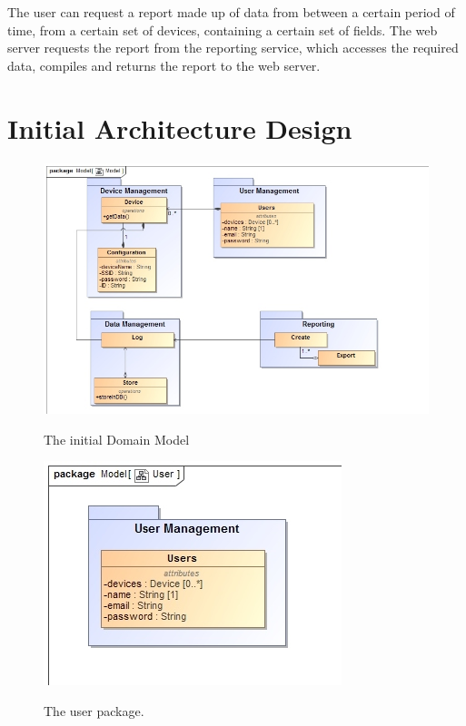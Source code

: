 \documentclass[paper=a4, fontsize=11pt]{scrartcl} %
\begin{document}
	The user can request a report made up of data from between a certain period of time, from a certain set of devices, containing a certain set of fields. The web server requests the report from the reporting service, which accesses the required data, compiles and returns the report to the web server.
	\newpage
	\section{Initial Architecture Design}
	\begin{figure}[H]
		\includegraphics[width=\textwidth]{images/ArchitecturalModel.jpg}  \\
		\caption{The initial Domain Model}
	\end{figure}
	
	\begin{figure}[H]
		\includegraphics[width=\textwidth]{images/User.jpg}  \\
		\caption{The user package.}
	\end{figure}
	
\end{document}
